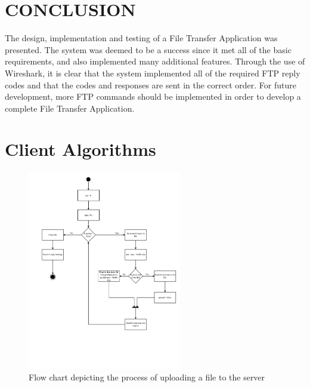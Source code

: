 \documentclass[10pt,twocolumn]{witseiepaper}
\begin{document}
\section{CONCLUSION} \label{sec:conclusion}
The design, implementation and testing of a File Transfer Application was presented. The system was deemed to be a success since it met all of the basic requirements, and also implemented many additional features. Through the use of Wireshark, it is clear that the system implemented all of the required FTP reply codes and that the codes and responses are sent in the correct order. For future development, more FTP commands should be implemented in order to develop a complete File Transfer Application.

%
\balance




\newpage
\setcounter{figure}{0} 
\renewcommand{\thefigure}
{A\arabic{figure}}
\onecolumn
\begin{appendix} \label{sec:appendix}
		
\section{Client Algorithms}

\begin{figure}[h]
	\centering
	\includegraphics[width=0.6\textwidth]{uploadfile.pdf}
	\caption{Flow chart depicting the process of uploading a file to the server}
	\raggedright
	\label{fig:upload}	
\end{figure}

\end{appendix}
\end{document}
